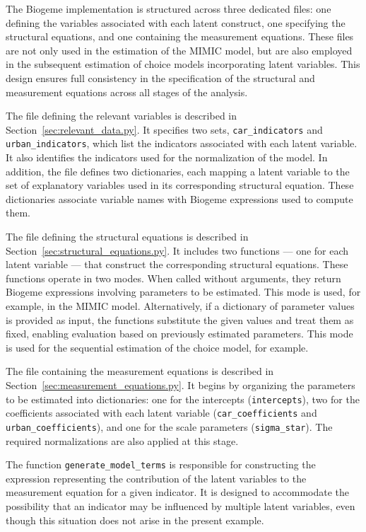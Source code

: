 \documentclass[12pt,a4paper]{article}
\begin{document}
The Biogeme implementation is structured across three dedicated files:
one defining the variables associated with each latent construct, one
specifying the structural equations, and one containing the
measurement equations. These files are not only used in the estimation
of the MIMIC model, but are also employed in the subsequent estimation
of choice models incorporating latent variables. This design ensures
full consistency in the specification of the structural and
measurement equations across all stages of the analysis.

The file defining the relevant variables is described in
Section~\ref{sec:relevant_data.py}. It specifies two sets,
\lstinline$car_indicators$ and \lstinline$urban_indicators$, which
list the indicators associated with each latent variable. It also
identifies the indicators used for the normalization of the model. In
addition, the file defines two dictionaries, each mapping a latent
variable to the set of explanatory variables used in its corresponding
structural equation. These dictionaries associate variable names with
Biogeme expressions used to compute them.

The file defining the structural equations is described in
Section~\ref{sec:structural_equations.py}. It includes two
functions --- one for each latent variable --- that construct the
corresponding structural equations. These functions operate in two
modes. When called without arguments, they return Biogeme expressions
involving parameters to be estimated. This mode is used, for example,
in the MIMIC model. Alternatively, if a dictionary of parameter values
is provided as input, the functions substitute the given values and
treat them as fixed, enabling evaluation based on previously estimated
parameters. This mode is used for the sequential estimation of the choice model, for example. 


The file containing the measurement equations is described in
Section~\ref{sec:measurement_equations.py}. It begins by organizing
the parameters to be estimated into dictionaries: one for the
intercepts (\lstinline$intercepts$), two for the coefficients
associated with each latent variable (\lstinline$car_coefficients$ and
\lstinline$urban_coefficients$), and one for the scale parameters
(\lstinline$sigma_star$). The required normalizations are also applied
at this stage.

The function \lstinline$generate_model_terms$ is responsible for
constructing the expression representing the contribution of the
latent variables to the measurement equation for a given indicator. It
is designed to accommodate the possibility that an indicator may be
influenced by multiple latent variables, even though this situation
does not arise in the present example.
\end{document}
